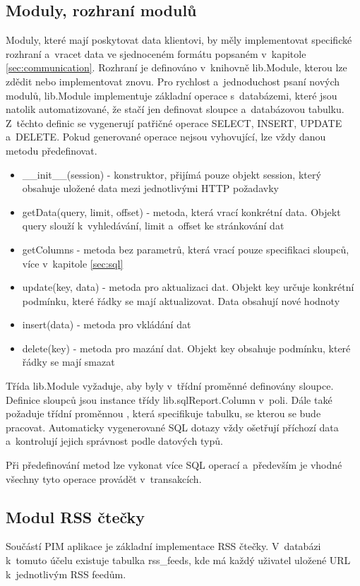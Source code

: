 \documentclass[bc,male,html,dept460]{diploma}				%
\begin{document}
\subsection{Moduly, rozhraní modulů}
\label{sec:modules}

Moduly, které mají poskytovat data klientovi, by měly implementovat specifické rozhraní a~vracet data ve sjednoceném formátu popsaném v~kapitole \ref{sec:communication}.
Rozhraní je definováno v~knihovně lib.Module, kterou lze zdědit nebo implementovat znovu. Pro rychlost a~jednoduchost psaní nových modulů, lib.Module implementuje základní operace s~databázemi, které jsou natolik automatizované, že stačí jen definovat sloupce a~databázovou tabulku. Z~těchto definic se vygenerují patřičné operace SELECT, INSERT, UPDATE a~DELETE. Pokud generované operace nejsou vyhovující, lze vždy danou metodu předefinovat.

\begin{itemize}
 \item \_\_init\_\_(session) - konstruktor, přijímá pouze objekt session, který obsahuje uložené data mezi jednotlivými HTTP požadavky
 \item getData(query, limit, offset) - metoda, která vrací konkrétní data. Objekt query slouží k~vyhledávání, limit a~offset ke stránkování dat
 \item getColumns - metoda bez parametrů, která vrací pouze specifikaci sloupců, více v~kapitole \ref{sec:sql}
 \item update(key, data) - metoda pro aktualizaci dat. Objekt key určuje konkrétní podmínku, které řádky se mají aktualizovat. Data obsahují nové hodnoty
 \item insert(data) - metoda pro vkládání dat
 \item delete(key) - metoda pro mazání dat. Objekt key obsahuje podmínku, které řádky se mají smazat
\end{itemize}

Třída lib.Module vyžaduje, aby byly v~třídní proměnné  definovány sloupce. Definice sloupců jsou instance třídy lib.sqlReport.Column v~poli. Dále také požaduje třídní proměnnou , která specifikuje tabulku, se kterou se bude pracovat.
Automaticky vygenerované SQL dotazy vždy ošetřují příchozí data a~kontrolují jejich správnost podle datových typů.

Při předefinování metod lze vykonat více SQL operací a~především je vhodné všechny tyto operace provádět v~transakcích.


\subsection{Modul RSS čtečky}
\label{sec:rss-server}
Součástí PIM aplikace je základní implementace RSS čtečky. V~databázi k~tomuto účelu existuje tabulka rss\_feeds, kde má každý uživatel uložené URL k~jednotlivým RSS feedům.
\end{document}
